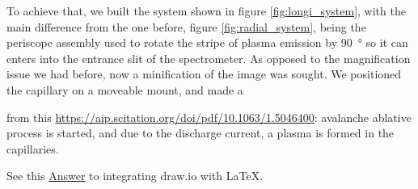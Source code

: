 \documentclass[justified,nofonts,nobib]{tufte-book}
\begin{document}
To achieve that, we built the system shown in figure \ref{fig:longi_system}, with the main difference from the one before, figure \ref{fig:radial_system}, being the periscope assembly used to rotate the stripe of plasma emission by \SI{90}{\degree} so it can enters into the entrance slit of the spectrometer. As opposed to the magnification issue we had before, now a minification of the image was sought. We positioned the capillary on a moveable mount, and made a 


from this \href{article}{https://aip.scitation.org/doi/pdf/10.1063/1.5046400}: avalanche ablative process is started, and due to the discharge current, a plasma is formed in the capillaries.

See this \href{https://tex.stackexchange.com/a/427625}{Answer} to integrating draw.io with LaTeX.

\printbibliography
\end{document}
